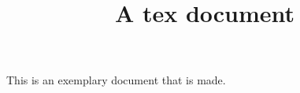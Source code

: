 \documentclass{article}
\title{A tex document}
\begin{document}
This is an exemplary document that is made.



\end{document}
